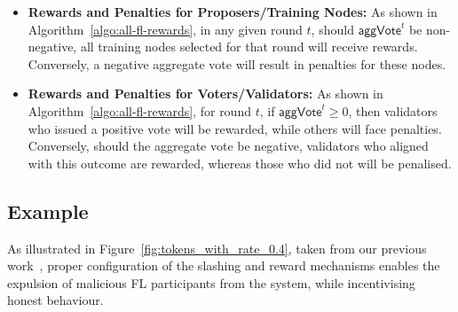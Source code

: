 \documentclass[conference]{IEEEtran}
\begin{document}
\begin{itemize}
    \item \textbf{Rewards and Penalties for Proposers/Training Nodes:} As shown in Algorithm~\ref{algo:all-fl-rewards}, in any given round $t$, should $\mathsf{aggVote}^t$ be non-negative, all training nodes selected for that round will receive rewards. Conversely, a negative aggregate vote will result in penalties for these nodes.
    
    \item \textbf{Rewards and Penalties for Voters/Validators:} As shown in Algorithm~\ref{algo:all-fl-rewards}, for round $t$, if $\mathsf{aggVote}^t \geq 0$, then validators who issued a positive vote will be rewarded, while others will face penalties. Conversely, should the aggregate vote be negative, validators who aligned with this outcome are rewarded, whereas those who did not will be penalised.
\end{itemize}













\subsection{Example} 
As illustrated in Figure~\ref{fig:tokens_with_rate_0.4}, taken from our previous work~\cite{dong2023defending}, proper configuration of the slashing and reward mechanisms enables the expulsion of malicious FL participants from the system, while incentivising honest behaviour. 
\end{document}
